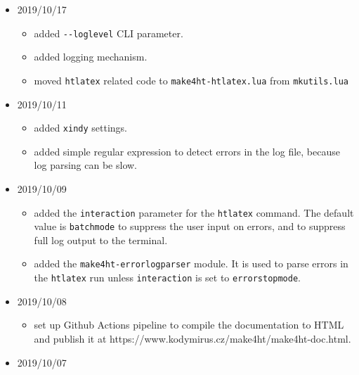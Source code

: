 \begin{itemize}
  \begin{itemize}
  \tightlist
  \item
    converted most print commands to use the logging mechanism.
  \item
    added \texttt{output} log level used for printing of the commands
    output.
  \end{itemize}
\item
  2019/10/17

  \begin{itemize}
  \tightlist
  \item
    added \texttt{-\/-loglevel} CLI parameter.
  \item
    added logging mechanism.
  \item
    moved \texttt{htlatex} related code to \texttt{make4ht-htlatex.lua}
    from \texttt{mkutils.lua}
  \end{itemize}
\item
  2019/10/11

  \begin{itemize}
  \tightlist
  \item
    added \texttt{xindy} settings.
  \item
    added simple regular expression to detect errors in the log file,
    because log parsing can be slow.
  \end{itemize}
\item
  2019/10/09

  \begin{itemize}
  \tightlist
  \item
    added the \texttt{interaction} parameter for the \texttt{htlatex}
    command. The default value is \texttt{batchmode} to suppress the
    user input on errors, and to suppress full log output to the
    terminal.
  \item
    added the \texttt{make4ht-errorlogparser} module. It is used to
    parse errors in the \texttt{htlatex} run unless \texttt{interaction}
    is set to \texttt{errorstopmode}.
  \end{itemize}
\item
  2019/10/08

  \begin{itemize}
  \tightlist
  \item
    set up Github Actions pipeline to compile the documentation to HTML
    and publish it at https://www.kodymirus.cz/make4ht/make4ht-doc.html.
  \end{itemize}
\item
  2019/10/07


\end{itemize}
